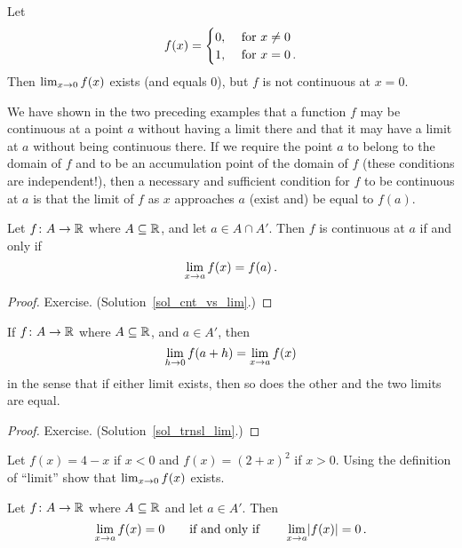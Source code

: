 \begin{exam} Let
   \[ f(x) = \begin{cases}    0,  &\text{ for $x \ne 0$} \\
                              1,  &\text{ for $x=0$\,.}
             \end{cases} \]
Then $\lim_{x \rightarrow 0}f(x)$ exists (and equals $0$), but $f$ is not continuous at $x = 0$.
\end{exam}

We have shown in the two preceding examples that a function $f$ may be continuous at a point
$a$ without having a limit there and that it may have a limit at $a$ without being continuous
there.  If we require the point $a$ to belong to the domain of $f$ and to be an accumulation
point of the domain of $f$ (these conditions are independent!), then a necessary and
sufficient condition for $f$ to be continuous at $a$ is that the limit of $f$ as $x$
approaches $a$ (exist and) be equal to $f(a)$.

\begin{prop}\label{cnt_vs_lim} Let $f \colon  A \rightarrow \mathbb{R}$ where $A \subseteq \mathbb{R}$, and let
$a \in A \cap A'$.  Then $f$ is continuous at $a$ if and only if
   \[ \lim_{x \rightarrow a}f(x) = f(a)\,. \]
\end{prop}

\begin{proof} Exercise.  (Solution~\ref{sol_cnt_vs_lim}.)  \ns \end{proof}

\begin{prop}\label{trnsl_lim} If $f \colon A \rightarrow \mathbb{R}$ where $A \subseteq \mathbb{R}$, and $a \in A'$, then
   \[ \lim_{h \rightarrow 0} f(a + h) = \lim_{x \rightarrow a} f(x) \]
in the sense that if either limit exists, then so does the other and the two limits are equal.
\end{prop}

\begin{proof} Exercise.   (Solution~\ref{sol_trnsl_lim}.)  \ns \end{proof}

\begin{prob}  Let $f(x) = 4 - x$ if $x < 0$ and $f(x) = (2 + x)^2$ if $x > 0$.  Using the
definition of ``limit'' show that $\lim_{x \rightarrow 0}f(x)$ exists.
\end{prob}

\begin{prop}  Let $f \colon A \rightarrow \mathbb{R}$ where $A \subseteq \mathbb{R}$ and let $a \in A'$.  Then
  \[ \lim_{x \rightarrow a}f(x) = 0 \qquad \text{if and only if} \qquad
                                        \lim_{x \rightarrow a}\lvert f(x)\rvert = 0\,. \]
\end{prop}

